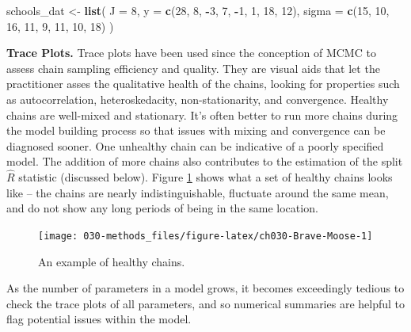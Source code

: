 \documentclass[11pt, oneside, openany]{scrbook}
\newenvironment{Shaded}{\begin{snugshade}}{\end{snugshade}}
\newcommand{\AttributeTok}[1]{\textcolor[rgb]{0.13,0.29,0.53}{#1}}
\newcommand{\DecValTok}[1]{\textcolor[rgb]{0.00,0.00,0.81}{#1}}
\newcommand{\FunctionTok}[1]{\textcolor[rgb]{0.13,0.29,0.53}{\textbf{#1}}}
\newcommand{\NormalTok}[1]{#1}
\newcommand{\OtherTok}[1]{\textcolor[rgb]{0.56,0.35,0.01}{#1}}
\newcommand{\SpecialCharTok}[1]{\textcolor[rgb]{0.81,0.36,0.00}{\textbf{#1}}}
\begin{document}
\begin{Shaded}
\begin{Highlighting}[]
\NormalTok{schools\_dat }\OtherTok{\textless{}{-}} \FunctionTok{list}\NormalTok{(}
  \AttributeTok{J =} \DecValTok{8}\NormalTok{,}
  \AttributeTok{y =} \FunctionTok{c}\NormalTok{(}\DecValTok{28}\NormalTok{,  }\DecValTok{8}\NormalTok{, }\SpecialCharTok{{-}}\DecValTok{3}\NormalTok{,  }\DecValTok{7}\NormalTok{, }\SpecialCharTok{{-}}\DecValTok{1}\NormalTok{,  }\DecValTok{1}\NormalTok{, }\DecValTok{18}\NormalTok{, }\DecValTok{12}\NormalTok{),}
  \AttributeTok{sigma =} \FunctionTok{c}\NormalTok{(}\DecValTok{15}\NormalTok{, }\DecValTok{10}\NormalTok{, }\DecValTok{16}\NormalTok{, }\DecValTok{11}\NormalTok{,  }\DecValTok{9}\NormalTok{, }\DecValTok{11}\NormalTok{, }\DecValTok{10}\NormalTok{, }\DecValTok{18}\NormalTok{)}
\NormalTok{)}
\end{Highlighting}
\end{Shaded}

\textbf{Trace Plots.} Trace plots have been used since the conception of MCMC to assess chain sampling efficiency and quality. They are visual aids that let the practitioner asses the qualitative health of the chains, looking for properties such as autocorrelation, heteroskedacity, non-stationarity, and convergence. Healthy chains are well-mixed and stationary. It's often better to run more chains during the model building process so that issues with mixing and convergence can be diagnosed sooner. One unhealthy chain can be indicative of a poorly specified model. The addition of more chains also contributes to the estimation of the split \(\hat{R}\) statistic (discussed below). Figure \ref{fig:ch030-Brave-Moose} shows what a set of healthy chains looks like -- the chains are nearly indistinguishable, fluctuate around the same mean, and do not show any long periods of being in the same location.

\begin{figure}

{\centering \texttt{[image: 030-methods\_files/figure-latex/ch030-Brave-Moose-1]} 

}

\caption{An example of healthy chains.}\label{fig:ch030-Brave-Moose}
\end{figure}

As the number of parameters in a model grows, it becomes exceedingly tedious to check the trace plots of all parameters, and so numerical summaries are helpful to flag potential issues within the model.
\end{document}
